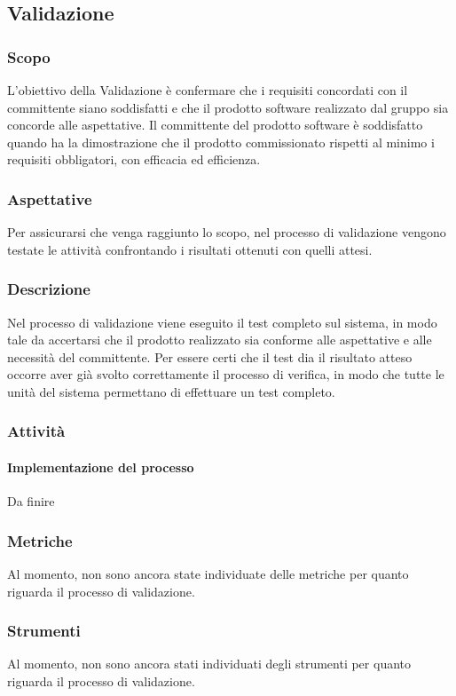 \subsection{Validazione}
\subsubsection{Scopo}
L’obiettivo della Validazione è confermare che i requisiti concordati con il committente siano soddisfatti e che il prodotto software realizzato dal gruppo sia concorde alle aspettative.
Il committente del prodotto software è soddisfatto quando ha la dimostrazione che il prodotto commissionato rispetti al minimo i requisiti obbligatori, con efficacia ed efficienza.
\subsubsection{Aspettative}
Per assicurarsi che venga raggiunto lo scopo, nel processo di validazione vengono testate le attività confrontando i risultati ottenuti con quelli attesi.
\subsubsection{Descrizione}
Nel processo di validazione viene eseguito il test completo sul sistema, in modo tale da accertarsi che il prodotto realizzato sia conforme alle aspettative e alle necessità del committente. 
Per essere certi che il test dia il risultato atteso occorre aver già svolto correttamente il processo di verifica, in modo che tutte le unità del sistema permettano di effettuare un test completo.
\subsubsection{Attività}
\paragraph{Implementazione del processo}
Da finire 
\subsubsection{Metriche}
Al momento, non sono ancora state individuate delle metriche per quanto riguarda il processo di validazione.
\subsubsection{Strumenti}
Al momento, non sono ancora stati individuati degli strumenti per quanto riguarda il processo di validazione.

